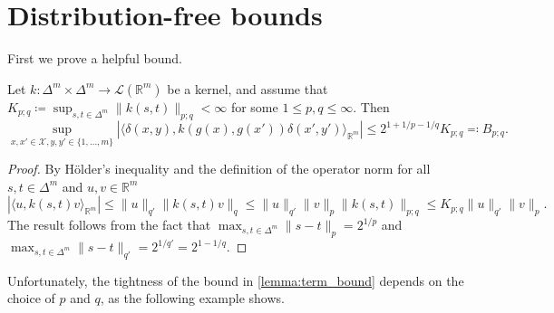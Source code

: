 \documentclass{article}
\begin{document}
\section{Distribution-free bounds}

First we prove a helpful bound.

\begin{lemma}\label{lemma:term_bound}
  Let $k \colon \Delta^m \times \Delta^m \to \mathcal{L}(\mathbb{R}^m)$ be a
  kernel, and assume that
  $K_{p;q} \coloneqq \sup_{s,t \in \Delta^m} \|k(s,t)\|_{p;q} < \infty$ for some
  $1 \leq p,q \leq \infty$. Then
  \begin{equation*}
    \sup_{x,x' \in \mathcal{X}, y,y' \in \{1,\ldots,m\}} \left|\langle \delta(x, y), k(g(x), g(x')) \delta(x', y') \rangle_{\mathbb{R}^m}\right|
    \leq 2^{1 + 1 / p - 1 / q} K_{p;q} \eqqcolon B_{p;q}.
  \end{equation*}
\end{lemma}

\begin{proof}
  By Hölder's inequality and the definition of the operator norm for all
  $s,t \in \Delta^m$ and $u,v \in \mathbb{R}^m$
  \begin{equation*}
    |\langle u, k(s,t)v \rangle_{\mathbb{R}^m}| \leq \|u\|_{q'} \|k(s,t)v\|_q \leq \|u\|_{q'} \|v\|_p \|k(s,t)\|_{p;q} \leq K_{p;q} \|u\|_{q'} \|v\|_p.
  \end{equation*}
  The result follows from the fact that
  $\max_{s,t \in \Delta^m} \|s - t\|_p = 2^{1/p}$ and
  $\max_{s,t \in \Delta^m} \|s - t\|_{q'} = 2^{1/q'} = 2^{1 - 1/q}$.
\end{proof}

Unfortunately, the tightness of the bound in \cref{lemma:term_bound} depends on
the choice of $p$ and $q$, as the following example shows.
\end{document}
